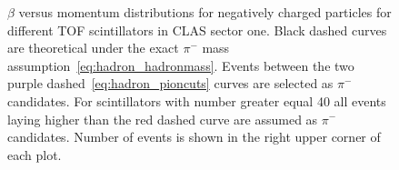 \begin{figure}[htp]
\begin{center}
\caption{\small  $\beta$ versus momentum distributions for negatively charged particles for different TOF scintillators in CLAS sector one. Black dashed curves are theoretical under the exact $\pi^{-}$ mass assumption~\ref{eq:hadron_hadronmass}. Events between the two purple dashed~\ref{eq:hadron_pioncuts} curves are selected as $\pi^{-}$ candidates. For scintillators with number greater equal 40 all events laying higher than  the red dashed curve are assumed as  $\pi^{-}$ candidates. Number of events is shown in the right upper corner of each plot. \label{fig:b_vs_p_negative}} 
\end{center}
\end{figure}

